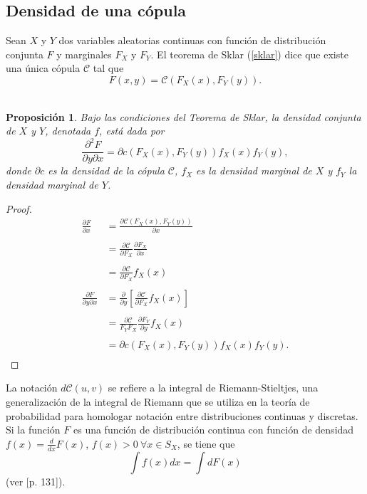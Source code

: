 \documentclass[11pt,a4paper]{article}
\newcommand{\C}{\mathcal{C}}
\newtheorem{proposition}{Proposición}[subsection]
\begin{document}
\appendixtitleon
\appendixtitletocon
\begin{appendices}
\section{Densidad de una cópula} \label{densidad_copula}

Sean $X$ y $Y$ dos variables aleatorias continuas con función de distribución conjunta $F$ y marginales $F_X$ y $F_Y$. El teorema de Sklar (\ref{sklar}) dice que existe una única cópula $\C$ tal que $$F(x, y) = \C(F_X(x), F_Y(y)).$$\\

\begin{proposition}
Bajo las condiciones del Teorema de Sklar, la densidad conjunta de $X$ y $Y$, denotada $f$, está dada por $$\frac{\partial^2 F}{\partial y \partial x} = \partial c(F_X(x), F_Y(y))f_X(x)f_Y(y),$$ donde $\partial c$ es la densidad de la cópula $\C$, $f_X$ es la densidad marginal de $X$ y $f_Y$ la densidad marginal de $Y$.
\end{proposition} 

\begin{proof}
\begin{align*}
\frac{\partial F}{\partial x} &= \frac{\partial \C(F_X(x), F_Y(y))}{\partial x}\\\\
&= \frac{\partial \C}{\partial F_X} \frac{\partial F_X}{\partial x}\\\\
&= \frac{\partial \C}{\partial F_X}f_X(x)\\\\
\frac{\partial F}{\partial y \partial x} &= \frac{\partial}{\partial y} \left[\frac{\partial \C}{\partial F_X}f_X(x)\right]\\\\
&= \frac{\partial \C}{F_Y F_X}\frac{\partial F_Y}{\partial y}f_X(x)\\\\
&= \partial c (F_X(x), F_Y(y)) f_X(x) f_Y(y).\\
\end{align*}
\end{proof}

La notación $d\C(u, v)$ se refiere a la integral de Riemann-Stieltjes, una generalización de la integral de Riemann que se utiliza en la teoría de probabilidad para homologar notación entre distribuciones continuas y discretas. Si la función $F$ es una función de distribución continua con función de densidad $f(x) = \frac{d}{dx}F(x)$, $f(x) > 0 \ \forall x \in S_X$, se tiene que $$\int f(x) dx = \int dF(x)$$ (ver \citet{rudin}[p. 131]).\\


\end{appendices}
\end{document}
